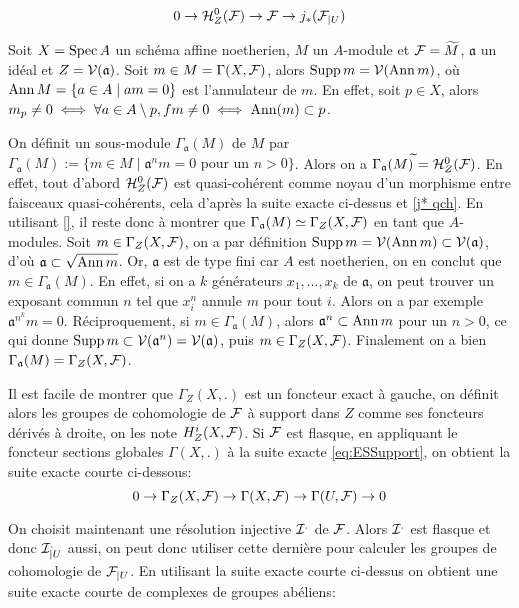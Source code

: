 \begin{equation}\label{eq:ESSupport}
0\rightarrow \mathcal{H}^0 _Z(\mathcal{F}) \rightarrow \mathcal{F} \rightarrow j_*(\mathcal{F}_{|U})
\end{equation}

\begin{ex}\label{cohomsupportaffineex}
Soit $X=\operatorname{Spec} A$ un schéma affine noetherien, $M$ un $A$-module et $\mathcal{F}=\widetilde{M}$, $\mathfrak{a}$ un idéal et $Z=\mathcal{V}(\mathfrak{a})$. Soit $m\in M=\Gamma(X,\mathcal{F})$, alors $\operatorname{Supp} m=\mathcal{V}(\operatorname{Ann} m)$, où $\operatorname{Ann} M=\lbrace a\in A\mid am=0\rbrace$ est l'annulateur de $m$. En effet, soit $p\in X$, alors $m_p\neq 0\iff \forall a\in A\setminus p, fm\neq 0\iff \operatorname{Ann}(m)\subset p$.

On définit un sous-module $\Gamma_\mathfrak{a}(M)$ de $M$ par $\Gamma_\mathfrak{a}(M):=\lbrace m\in M\mid \mathfrak{a}^nm=0 \text{ pour un } n>0 \rbrace$. Alors on a $\Gamma_\mathfrak{a}(M)^{\widetilde{}} = \mathcal{H} ^0 _Z(\mathcal{F})$. En effet, tout d'abord $\mathcal{H}^0 _Z(\mathcal{F})$ est quasi-cohérent comme noyau d'un morphisme entre faisceaux quasi-cohérents, cela d'après la suite exacte ci-dessus et \ref{j* qch}. En utilisant \ref{}, il reste donc à montrer que $\Gamma_\mathfrak{a}(M)\simeq\Gamma_Z(X,\mathcal{F})$ en tant que $A$-modules. Soit $m\in\Gamma_Z(X,\mathcal{F})$, on a par définition $\operatorname{Supp} m=\mathcal{V}(\operatorname{Ann} m)\subset \mathcal{V}(\mathfrak{a})$, d'où $\mathfrak{a}\subset \sqrt{\operatorname{Ann} m}$. Or, $\mathfrak{a}$ est de type fini car $A$ est noetherien, on en conclut que $m\in \Gamma_\mathfrak{a}(M)$. En effet, si on a $k$ générateurs $x_1,...,x_k$ de $\mathfrak{a}$, on peut trouver un exposant commun $n$ tel que $x^n_i$ annule $m$ pour tout $i$. Alors on a par exemple $\mathfrak{a}^{n^k}m=0$. Réciproquement, si $m\in \Gamma_\mathfrak{a}(M)$, alors $\mathfrak{a}^n\subset \operatorname{Ann} m$ pour un $n>0$, ce qui donne $\operatorname{Supp} m \subset\mathcal{V}(\mathfrak{a}^n)=\mathcal{V}(\mathfrak{a})$, puis $m\in \Gamma_Z(X,\mathcal{F})$. Finalement on a bien $\Gamma_\mathfrak{a}(M)=\Gamma_Z(X,\mathcal{F})$.
\end{ex}

Il est facile de montrer que $\Gamma_Z(X, .)$ est un foncteur exact à gauche, on définit alors les groupes de cohomologie de $\mathcal{F}$ à support dans $Z$ comme ses foncteurs dérivés à droite, on les note $H_Z^i(X,\mathcal{F})$. Si $\mathcal{F}$ est flasque, en appliquant le foncteur sections globales $\Gamma(X,.)$ à la suite exacte \ref{eq:ESSupport}, on obtient la suite exacte courte ci-dessous:
$$0\rightarrow \Gamma_Z(X,\mathcal{F})\rightarrow \Gamma(X,\mathcal{F})\rightarrow \Gamma(U,\mathcal{F})\rightarrow 0$$

On choisit maintenant une résolution injective $\mathcal{I}^.$ de $\mathcal{F}$. Alors $\mathcal{I}^.$ est flasque et donc $\mathcal{I}^._{|U}$ aussi, on peut donc utiliser cette dernière pour calculer les groupes de cohomologie de $\mathcal{F}_{|U}$.   En utilisant la suite exacte courte ci-dessus on obtient une suite exacte courte de complexes de groupes abéliens:

